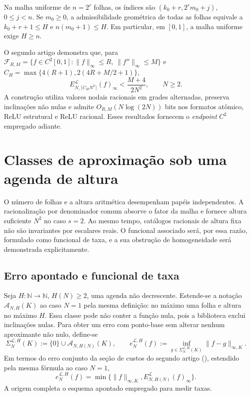 \documentclass[12pt,a4paper]{article}
\makeatletter
\theoremstyle{preciso}
\theoremstyle{definition}
\newcommand{\Aclass}{\mathcal{A}}
\newcommand{\Library}{\mathcal{L}}
\theoremstyle{preciso}
\theoremstyle{preciso}
\theoremstyle{preciso}
\theoremstyle{preciso}
\theoremstyle{definition}
\theoremstyle{preciso}
\theoremstyle{definition}
\theoremstyle{preciso}
\theoremstyle{preciso}
\theoremstyle{definition}
\newcommand{\abntlookup}[2]{\ifcsname ab#1@#2\endcsname\csname ab#1@#2\endcsname\else\textbf{??}\PackageWarning{abnt}{Citacao indefinida: #2}\fi}
\newcommand{\abntpar}[1]{\hyperlink{bib:#1}{\abntlookup{U}{#1}, \abntlookup{Y}{#1}}}
\newcommand{\abntsep}{}
\newcommand{\abntpitem}[1]{\abntsep\renewcommand{\abntsep}{; }\abntpar{#1}}
\newcommand{\citep}[2][]{\begingroup\renewcommand{\abntsep}{}(\forcsvlist{\abntpitem}{#2}\ifblank{#1}{}{, #1})\endgroup}
\makeatother
\begin{document}
Na malha uniforme de $n=2^r$ folhas, os índices são $(k_0+r,2^rm_0+j)$, $0\le j<n$. Se $m_0\ge0$, a admissibilidade geométrica de todas as folhas equivale a $k_0+r+1\le H$ e $n(m_0+1)\le H$. Em particular, em $[0,1]$, a malha uniforme exige $H\ge n$.

O segundo artigo demonstra que, para $\mathcal F_{R,M}=\{f\in C^2[0,1]:\|f\|_\infty\le R,\ \|f''\|_\infty\le M\}$ e $C_H=\max\{4(R+1),2(4R+M/2+1)\}$,
\[
 E_{N,\lceil C_HN^2\rceil}^{\Library}(f)_\infty<\frac{M+4}{2N^2},\qquad N\ge2.
\]
A construção utiliza valores nodais racionais em grades alternadas, preserva inclinações não nulas e admite $O_{R,M}(N\log(2N))$ bits nos formatos atômico, ReLU estrutural e ReLU racional. Esses resultados fornecem o \emph{endpoint} $C^2$ empregado adiante.

\section{Classes de aproximação sob uma agenda de altura}
\label{artigo_3:sec:approximation-classes}

O número de folhas e a altura aritmética desempenham papéis independentes. A
racionalização por denominador comum absorve o fator da malha e fornece
altura suficiente $N^2$ no caso $s=2$. Ao mesmo tempo, catálogos racionais de
altura fixa não são invariantes por escalares reais. O funcional
associado será, por essa razão, formulado como funcional de taxa, e a sua obstrução de
homogeneidade será demonstrada explicitamente.

\subsection{Erro apontado e funcional de taxa}

Seja $H:\mathbb N\to\mathbb N$, $H(N)\ge2$, uma agenda não decrescente.
Estende-se a notação $\Aclass_{N,H}(K)$ ao caso $N=1$ pela mesma
definição: no máximo uma folha e altura no máximo $H$. Essa classe pode não
conter a função nula, pois a
biblioteca exclui inclinações nulas. Para obter um erro com ponto-base sem
alterar nenhum aproximante não nulo, define-se
\begin{equation}
 \Sigma_N^{\Library,H}(K)
 :=\{0\}\cup\Aclass_{N,H(N)}(K),
 \qquad
 e_N^{\Library,H}(f)
 :=\inf_{g\in\Sigma_N^{\Library,H}(K)}\|f-g\|_{\infty,K}.
 \label{artigo_3:eq:pointed-error}
\end{equation}
Em termos do erro conjunto da seção de custos do segundo artigo \citep{artigo_2-oliveiraII}, estendido pela mesma fórmula
ao caso $N=1$,
\begin{equation}
 e_N^{\Library,H}(f)
 =\min\bigl\{\|f\|_{\infty,K},
 E_{N,H(N)}^{\Library}(f)_\infty\bigr\}.
 \label{artigo_3:eq:pointed-inherited}
\end{equation}
A origem completa o esquema apontado empregado para medir taxas.
\end{document}
